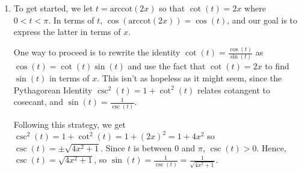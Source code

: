 \documentclass{ximera}
\begin{document}
\begin{example}
\begin{explanation}
\begin{enumerate}
\begin{enumerate}
 

To find the domain, we once again think of $f(x) = \tan(2 \arctan(x))$ as a  sequence of steps and work from the inside out.

 

The first step is to find the arctangent of a real number.  Since the domain of $\arctan(x)$ is all real numbers, we have no restrictions here and we get out all values $\left(-\frac{\pi}{2}, \frac{\pi}{2} \right)$.

 

The next step is to multiply $\arctan(x)$ by $2$.  There are no restrictions here, either.   Since the range of $\arctan(x)$ is $\left(-\frac{\pi}{2}, \frac{\pi}{2} \right)$, the range of $2 \arctan(x)$ is $(-\pi, \pi)$.  

 

The last step is to take the tangent of $2 \arctan(x)$.  Since we are taking the tangent of values in the interval $(-\pi, \pi)$,   we will run into trouble if $2 \arctan(x) = \pm \frac{\pi}{2}$, that is,  if $\arctan(x) = \pm \frac{\pi}{4}$. Since this happens exactly when $x = \tan\left( \pm \frac{\pi}{4}\right) = \pm 1$, we must exclude $x = \pm 1$ from the domain of $f$.

 

Hence, the domain of   $f(x) = \tan(2 \arctan(x))$ is  $(-\infty, -1) \cup (-1,1) \cup (1,\infty)$. In this example, we could have obtained the correct answer by looking at the algebraic equivalence, $f(x) =  \frac{2x}{1-x^2}$.  However, as we saw in Example \ref{arccosinesineex}, number \ref{cosarcsin}, this is not always the case.


\item To get started, we let $t = \text{arccot}(2x)$ so that  $\cot(t) = 2x$ where $0 < t < \pi$.  In terms of $t$, $\cos(\text{arccot}(2x)) = \cos(t)$, and our goal is to express the latter in terms of $x$.   

 

One way to proceed is to rewrite the identity $\cot(t) = \frac{\cos(t)}{\sin(t)}$ as $\cos(t) = \cot(t) \sin(t)$ and use the fact that $\cot(t) = 2x$ to find $\sin(t)$ in terms of $x$.  This isn't as hopeless as it might seem, since the Pythagorean Identity $\csc^{2}(t) = 1 + \cot^{2}(t)$ relates cotangent to cosecant, and $\sin(t) = \frac{1}{\csc(t)}$.

 

Following this strategy, we get $\csc^{2} (t) = 1 + \cot^{2}(t) = 1 + (2x)^2 = 1 + 4x^2$ so $\csc(t) = \pm \sqrt{4x^2+1}$. Since $t$ is between $0$ and $\pi$, $\csc(t) > 0$.  Hence,  $\csc(t) =\sqrt{4x^2+1}$, so  $\sin(t) =  \frac{1}{\csc(t)} = \frac{1}{\sqrt{4x^2+1}}$.


\end{enumerate}
\end{enumerate}
\end{explanation}
\end{example}
\end{document}

